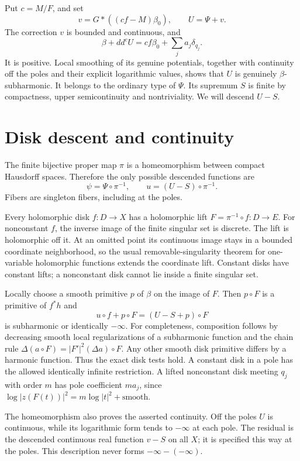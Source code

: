 \documentclass[11pt]{article}
\newcommand{\ddc}{dd^c}
\begin{document}
Put $c=M/F$, and set
\begin{equation}\label{eq:solution}
 v=G*((cf-M)\beta_0),\qquad U=\Psi+v.
\end{equation}
The correction $v$ is bounded and continuous, and
\begin{equation}\label{eq:solution-current}
 \beta+\ddc U=cf\beta_0+\sum_ja_j\delta_{q_j}.
\end{equation}
It is positive. Local smoothing of its genuine potentials, together
with continuity off the poles and their explicit logarithmic values,
shows that $U$ is genuinely $\beta$-subharmonic. It belongs to the
ordinary type of $\Psi$. Its supremum $S$ is finite by compactness,
upper semicontinuity and nontriviality. We will descend $U-S$.

\section{Disk descent and continuity}
The finite bijective proper map $\pi$ is a homeomorphism between
compact Hausdorff spaces. Therefore the only possible descended
functions are
\[
 \psi=\Psi\circ\pi^{-1},\qquad u=(U-S)\circ\pi^{-1}.
\]
Fibers are singleton fibers, including at the poles.

Every holomorphic disk $f:D\to X$ has a holomorphic lift
$F=\pi^{-1}\circ f:D\to E$. For nonconstant $f$, the inverse
image of the finite singular set is discrete. The lift is holomorphic
off it. At an omitted point its continuous image stays in a bounded
coordinate neighborhood, so the usual removable-singularity theorem
for one-variable holomorphic functions extends the coordinate lift.
Constant disks have constant lifts; a nonconstant disk cannot lie
inside a finite singular set.

Locally choose a smooth primitive $p$ of $\beta$ on the image of $F$.
Then $p\circ F$ is a primitive of $f^*h$ and
\[
 u\circ f+p\circ F=(U-S+p)\circ F
\]
is subharmonic or identically $-\infty$. For completeness, composition
follows by decreasing smooth local regularizations of a subharmonic
function and the chain rule
$\Delta(a\circ F)=|F'|^2(\Delta a)\circ F$.
Any other smooth disk primitive differs by a harmonic function.
Thus the exact disk tests hold. A constant disk in a pole has the
allowed identically infinite restriction. A lifted nonconstant disk
meeting $q_j$ with order $m$ has pole coefficient $ma_j$, since
$\log|z(F(t))|^2=m\log|t|^2+\text{smooth}$.

The homeomorphism also proves the asserted continuity. Off the poles
$U$ is continuous, while its logarithmic form tends to $-\infty$
at each pole. The residual is the descended continuous real function
$v-S$ on all $X$; it is specified this way at the poles. This
description never forms $-\infty-(-\infty)$.
\end{document}
